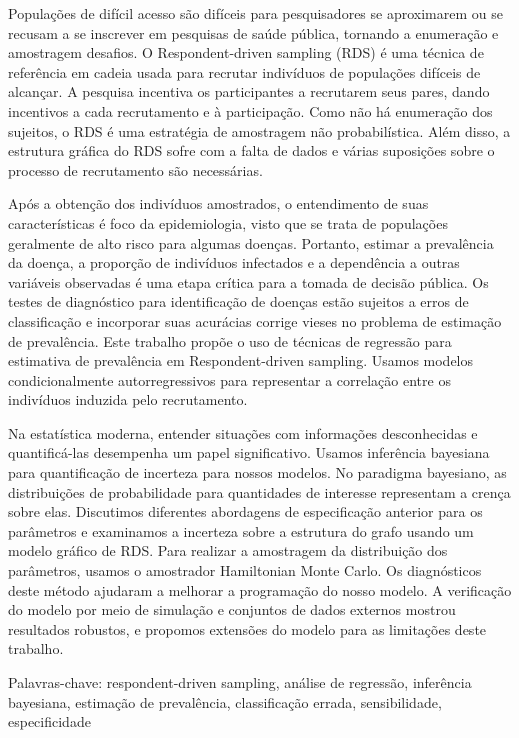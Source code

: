 \begin{resumo}[Resumo]

    Populações de difícil acesso são difíceis para pesquisadores se aproximarem
    ou se recusam a se inscrever em pesquisas de saúde pública, tornando a
    enumeração e amostragem desafios. O Respondent-driven sampling
    (RDS) é uma técnica de referência em cadeia usada para recrutar indivíduos
    de populações difíceis de alcançar. A pesquisa incentiva os participantes
    a recrutarem seus pares, dando incentivos a cada recrutamento e à
    participação. Como não há enumeração dos sujeitos, o RDS é uma estratégia
    de amostragem não probabilística. Além disso, a estrutura gráfica do RDS
    sofre com a falta de dados e várias suposições sobre o processo de
    recrutamento são necessárias. 

    Após a obtenção dos indivíduos amostrados, o entendimento de suas
    características é foco da epidemiologia, visto que se trata de
    populações geralmente de alto risco para algumas doenças. Portanto,
    estimar a prevalência da doença, a proporção de indivíduos infectados e a
    dependência a outras variáveis observadas é uma etapa crítica para a
    tomada de decisão pública. Os testes de diagnóstico para identificação de
    doenças estão sujeitos a erros de classificação e incorporar suas
    acurácias corrige vieses no problema de estimação de prevalência. Este
    trabalho propõe o uso de técnicas de regressão para estimativa de
    prevalência em Respondent-driven sampling. Usamos modelos
    condicionalmente autorregressivos para representar a correlação entre os
    indivíduos induzida pelo recrutamento. 
    
    Na estatística moderna, entender situações com informações desconhecidas e
    quantificá-las desempenha um papel significativo. Usamos inferência
    bayesiana para quantificação de incerteza para nossos modelos. No
    paradigma bayesiano, as distribuições de probabilidade para quantidades de
    interesse representam a crença sobre elas. Discutimos diferentes
    abordagens de especificação anterior para os parâmetros e examinamos a
    incerteza sobre a estrutura do grafo usando um modelo gráfico de RDS.
    Para realizar a amostragem da distribuição dos parâmetros, usamos o
    amostrador Hamiltonian Monte Carlo. Os diagnósticos deste método ajudaram a
    melhorar a programação do nosso modelo. A verificação do modelo por meio
    de simulação e conjuntos de dados externos mostrou resultados robustos, e
    propomos extensões do modelo para as limitações deste trabalho. 
    
    Palavras-chave: respondent-driven sampling, análise de regressão,
    inferência bayesiana, estimação de prevalência, classificação errada,
    sensibilidade, especificidade
\end{resumo}